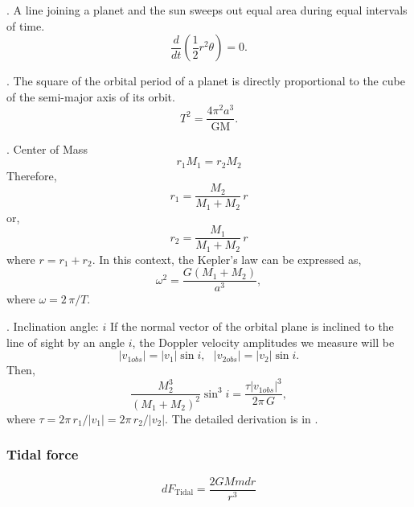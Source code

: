 . A line joining a planet and the sun sweeps out equal area during equal intervals of time.
\begin{equation}
   \frac{d}{dt}\left( \frac{1}{2} r^{2}\theta \right) = 0. \nonumber
\end{equation}

. The square of the orbital period of a planet is directly proportional to the cube of the 
semi-major axis of its orbit.
\begin{equation}
   T^{2} = \frac{4\pi^{2}a^{3}}{\textrm{GM}}. \nonumber
\end{equation}

. Center of Mass
\begin{equation}
    r_{1}M_{1} = r_{2}M_{2}
\end{equation}
Therefore,
\begin{equation}
    r_{1} = \frac{M_{2}}{M_{1}+M_{2}}\,r
\end{equation}
or,
\begin{equation}
    r_{2} = \frac{M_{1}}{M_{1}+M_{2}}\,r
\end{equation}
where $r = r_{1}+r_{2}$. In this context, the Kepler's law can be expressed as,
\begin{equation}
    \omega^{2} = \frac{G\left( M_{1}+M_{2} \right)}{a^{3}},
\end{equation}
where $\omega = 2\,\pi/T$.

. Inclination angle: $i$
If the normal vector of the orbital plane is inclined to the line of sight by an angle $i$, the 
Doppler velocity amplitudes we measure will be 
\begin{equation}
    |v_{1obs}| = |v_{1}|\sin{i}, ~~~ |v_{2obs}| = |v_{2}|\sin{i}.
\end{equation}
Then,
\begin{equation}
    \frac{M_{2}^{3}}{(M_{1}+M_{2})^{2}}\sin^{3}{i} = \frac{\tau |v_{1obs}|^{3}}{2\pi\,G},
\end{equation}
where $\tau = 2\pi\,r_{1}/|v_{1}| = 2\pi\,r_{2}/|v_{2}|$. The detailed derivation is in \cite{Maoz}.

\subsubsection{Tidal force}
\begin{equation}
   dF_{\textrm{Tidal}} = \frac{2 G M m dr}{r^{3}} \nonumber
\end{equation}

